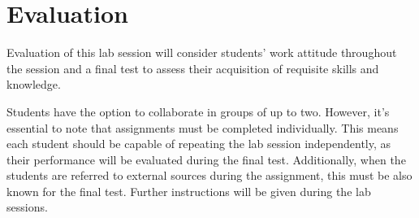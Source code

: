 \chapter{Evaluation}

Evaluation of this lab session will consider students' work attitude throughout the session and a final test to assess their acquisition of requisite skills and knowledge.

Students have the option to collaborate in groups of up to two. However, it's essential to note that assignments must be completed individually. This means each student should be capable of repeating the lab session independently, as their performance will be evaluated during the final test. Additionally, when the students are referred to external sources during the assignment, this must be also known for the final test.
Further instructions will be given during the lab sessions.
